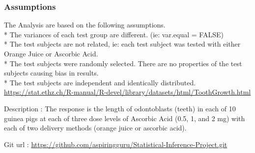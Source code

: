 \documentclass[]{article}
\begin{document}
\subsubsection{Assumptions}\label{assumptions}

The Analysis are based on the following assumptions.\\* The variances of
each test group are different. (ie: var.equal = FALSE)\\* The test
subjects are not related, ie: each test subject was tested with either
Orange Juice or Ascorbic Acid.\\* The test subjects were randomly
selected. There are no properties of the test subjects causing bias in
results.\\* The test subjects are independent and identically
distributed.\\\url{https://stat.ethz.ch/R-manual/R-devel/library/datasets/html/ToothGrowth.html}

Description : The response is the length of odontoblasts (teeth) in each
of 10 guinea pigs at each of three dose levels of Ascorbic Acid (0.5, 1,
and 2 mg) with each of two delivery methods (orange juice or ascorbic
acid).

Git url :
\url{https://github.com/aspiringguru/Statistical-Inference-Project.git}
\end{document}
